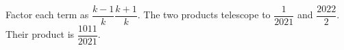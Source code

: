 Factor each term as $\dfrac{k-1}{k}\dfrac{k+1}{k}$. The two products telescope to $\dfrac{1}{2021}$ and $\dfrac{2022}{2}$. Their product is $\boxed{\dfrac{1011}{2021}}$.
